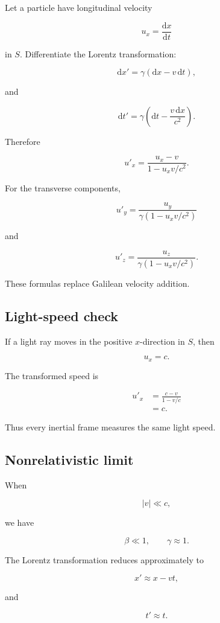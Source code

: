 Let a particle have longitudinal velocity

\[
u_{x}
=
\frac{\mathrm{d}x}{\mathrm{d}t}
\]

in \(S\). Differentiate the Lorentz transformation:

\[
\mathrm{d}x'
=
\gamma(\mathrm{d}x-v\,\mathrm{d}t),
\]

and

\[
\mathrm{d}t'
=
\gamma\left(
\mathrm{d}t-
\frac{v\,\mathrm{d}x}{c^{2}}
\right).
\]

Therefore

\[
\boxed{
u'_{x}
=
\frac{u_{x}-v}
{1-u_{x}v/c^{2}}
}.
\]

For the transverse components,

\[
\boxed{
u'_{y}
=
\frac{u_{y}}
{\gamma(1-u_{x}v/c^{2})}
}
\]

and

\[
\boxed{
u'_{z}
=
\frac{u_{z}}
{\gamma(1-u_{x}v/c^{2})}
}.
\]

These formulas replace Galilean velocity addition.

\subsection{Light-speed check}

If a light ray moves in the positive \(x\)-direction in \(S\), then

\[
u_{x}=c.
\]

The transformed speed is

\[
\begin{aligned}
u'_{x}
&=
\frac{c-v}{1-v/c}\\
&=
c.
\end{aligned}
\]

Thus every inertial frame measures the same light speed.

\subsection{Nonrelativistic limit}

When

\[
|v|\ll c,
\]

we have

\[
\beta\ll1,
\qquad
\gamma\approx1.
\]

The Lorentz transformation reduces approximately to

\[
x'
\approx
x-vt,
\]

and

\[
t'
\approx
t.
\]

